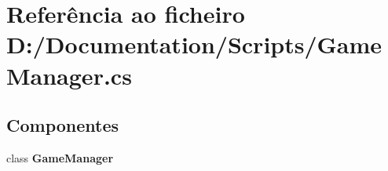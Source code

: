 \section{Referência ao ficheiro D\+:/\+Documentation/\+Scripts/\+Game\+Manager.cs}
\label{_game_manager_8cs}
\subsection*{Componentes}
\begin{DoxyCompactItemize}
\item 
class \textbf{ Game\+Manager}
\end{DoxyCompactItemize}
